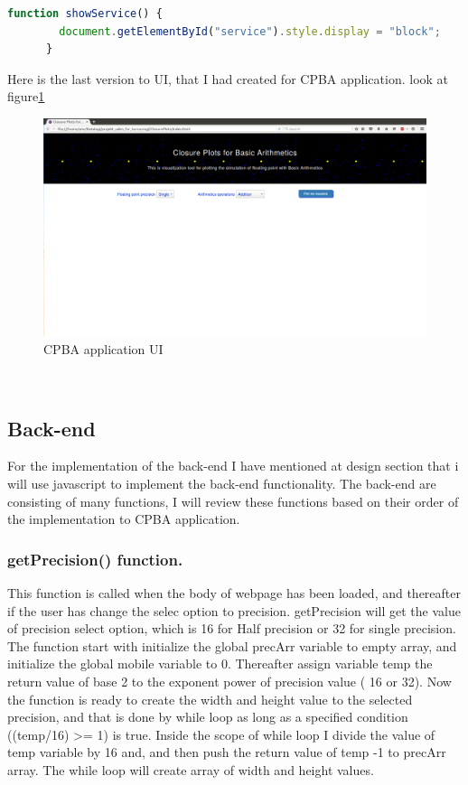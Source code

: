 \documentclass[11pt]{article}
\begin{document}
\begin{lstlisting}[label={lst:showService}, language=Javascript, caption={showService function will change style of buttons to block},]
      function showService() {
        document.getElementById("service").style.display = "block";
      }
\end{lstlisting}
Here is the last version to UI, that I had created for CPBA application. look at figure\ref{UI}
\begin{figure}[h]
    \centering
    \includegraphics[width=1\textwidth]{layout}
    \caption{CPBA application UI}
    \label{UI}
\end{figure}\\
\subsection{Back-end}
For the implementation of the back-end I have mentioned at design section that i will use javascript to implement the back-end functionality. The back-end are consisting of many functions, I will review these functions based on their order of the implementation to CPBA application.
\subsubsection{getPrecision() function.}
This function is called when the body of webpage has been loaded, and thereafter if the user has change the selec option to precision. getPrecision will get the value of precision select option, which is 16 for Half precision  or 32 for single precision. The function start with initialize the global precArr variable to empty array, and initialize the global mobile variable to 0. Thereafter assign variable temp the return value of base 2 to the exponent power of precision value ( 16 or 32).
Now the function is ready to create the width and height value to the selected precision, and that is done by while loop as long as a specified condition ((temp/16) >= 1) is true. Inside the scope of while loop I divide the value of temp variable by 16 and, and then push the return value of temp -1 to precArr array. The while loop will create array of width and height values.\\
\end{document}
